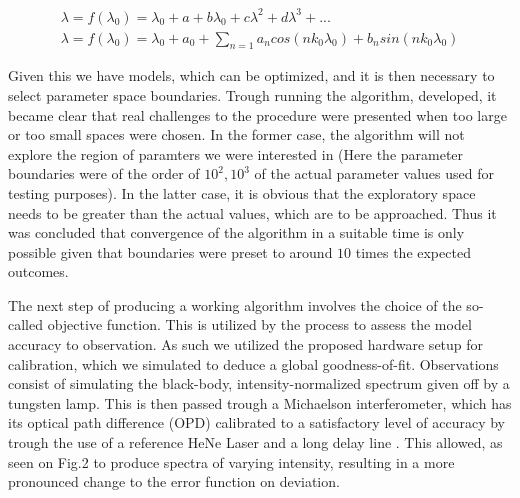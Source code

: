 \documentclass[12pt]{article}
\begin{document}
    \begin{gather}
        \lambda = f(\lambda_0) = \lambda_0 + a + b\lambda_0 + c\lambda^2 + d\lambda^3 + ...\\
        \lambda = f(\lambda_0) = \lambda_0 + a_0 + \sum_{n=1} a_ncos(n k_0\lambda_0) +
        b_nsin(n k_0\lambda_0)
    \end{gather}

    Given this we have models, which can be optimized, and it is then necessary to 
    select parameter space boundaries. Trough running the algorithm, developed, it became
    clear that real challenges to the procedure were presented when too large or too
    small spaces were chosen. In the former case, the algorithm will not explore
    the region of paramters we were interested in (Here the parameter boundaries
    were of the order of $10^2, 10^3$ of the actual parameter values used for testing purposes).
    In the latter case, it is obvious that the exploratory space needs to be greater
    than the actual values, which are to be approached. Thus it was concluded that 
    convergence of the algorithm in a suitable time is only possible given that boundaries
    were preset to around $10$ times the expected outcomes. 


    The next step of producing a working algorithm involves the choice of the 
    so-called objective function. This is utilized by the process to assess the 
    model accuracy to observation. As such we utilized the proposed hardware setup
    for calibration, which we simulated to deduce a global goodness-of-fit. Observations
    consist of simulating the black-body, intensity-normalized spectrum given off by
    a tungsten lamp. This is then passed trough a Michaelson interferometer, which has
    its optical path difference (OPD) calibrated to a satisfactory level of accuracy by 
    trough the use of a reference HeNe Laser and a long delay line \cite{Interferometer}.
    This allowed, as seen on Fig.2 to produce spectra of varying intensity, resulting in 
    a more pronounced change to the error function on deviation.
\end{document}

